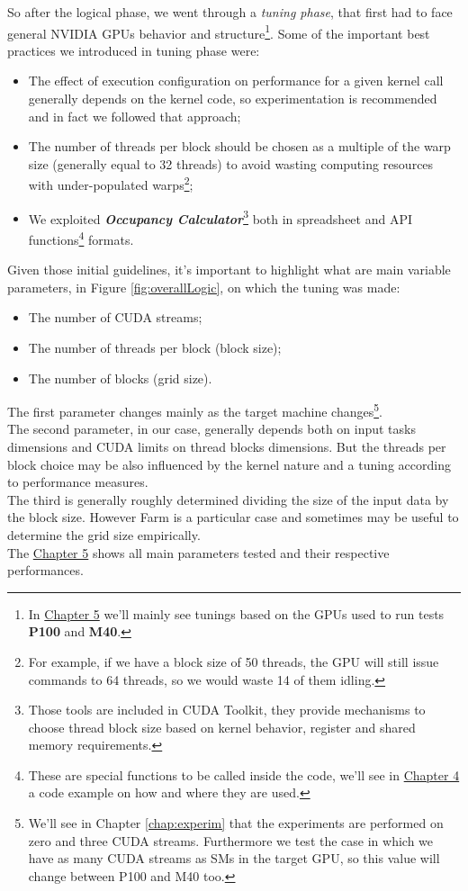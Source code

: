	So after the logical phase, we went through a \textit{tuning phase}, that first had to face general NVIDIA GPUs behavior and structure\footnote{In \hyperref[chap:experim]{Chapter 5} we'll mainly see tunings based on the GPUs used to run tests \textendash \textbf{P100} and \textbf{M40}.}.
	Some of the important best practices we introduced in tuning phase were:

	\begin{itemize}
		\item The effect of execution configuration on performance for a given kernel call generally
		depends on the kernel code, so experimentation is recommended\cite{cudabestpractices} and in fact we followed that approach;
		\item The number of threads per block should be chosen as a multiple of the warp size (generally equal to 32 threads) to avoid wasting computing resources with under-populated warps\footnote{For example, if we have a block size of 50 threads, the GPU will still issue commands to 64 threads, so we would waste 14 of them idling.}\cite{cudabestpractices};
		\item We exploited \textbf{\textit{Occupancy Calculator}}\footnote{Those tools are included in CUDA Toolkit, they provide mechanisms to choose thread block size based on kernel behavior, register and shared memory requirements.} both in spreadsheet and API functions\footnote{These are special functions to be called inside the code, we'll see in \hyperref[chap:impl]{Chapter 4} a code example on how and where they are used.} formats\cite{cudaguide}.
		 
	\end{itemize}

	Given those initial guidelines, it's important to highlight what are main variable parameters, in Figure \ref{fig:overallLogic}, on which the tuning was made:
	\begin{itemize}
		\item The number of CUDA streams;		
		\item The number of threads per block (block size);
		\item The number of blocks (grid size).
	\end{itemize}
	The first parameter changes mainly as the target machine changes\footnote{We'll see in Chapter \ref{chap:experim} that the experiments are performed on zero and three CUDA streams. Furthermore we test the case in which we have as many CUDA streams as SMs in the target GPU, so this value will change between P100 and M40 too.}.\\
	The second parameter, in our case, generally depends both on input tasks dimensions and CUDA limits on thread blocks dimensions. But the threads per block choice may be also influenced by the kernel nature and a tuning according to performance measures.\\
	The third is generally roughly determined dividing the size of the input data by the block size. However Farm is a particular case and sometimes may be useful to determine the grid size empirically.\\
	The \hyperref[chap:experim]{Chapter 5} shows all main parameters tested and their respective performances.
 
